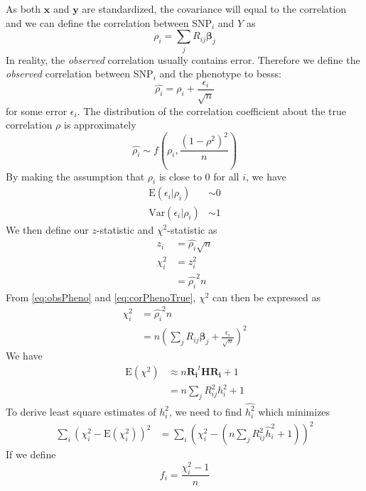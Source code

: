 			As both $\boldsymbol{x}$ and $\boldsymbol{y}$ are standardized, the covariance will equal to the correlation and we can define the correlation between \gls{SNP}$_i$ and $Y$ as
			\begin{equation}
				\rho_i = \sum_j{R_{ij}\boldsymbol{\beta}_j}
				\label{eq:corPhenoTrue}
			\end{equation}
			In reality, the \emph{observed} correlation usually contains error. 
			Therefore we define the \emph{observed} correlation between \gls{SNP}$_i$ and the phenotype to besss:
			\begin{equation}
			\hat{\rho_i} = \rho_i+\frac{\epsilon_i}{\sqrt{n}}
			\label{eq:obsPheno}
			\end{equation}
			for some error $\epsilon_i$. 
			The distribution of the correlation coefficient about the true correlation $\rho$ is approximately
			$$
				\hat{\rho_i}\sim f(\rho_i, \frac{(1-\rho^2)^2}{n})
			$$
			By making the assumption that $\rho_i$ is close to 0 for all $i$, we have 
			\begin{align*}
				\mathrm{E}(\epsilon_i|\rho_i)&\sim 0\\
				\mathrm{Var}(\epsilon_i|\rho_i)&\sim 1
			\end{align*}
			We then define our $z$-statistic and $\chi^2$-statistic as
			\begin{align*}
				z_i &= \hat{\rho_i}\sqrt{n} \\
				\chi^2_i &= z_i^2\\
				&=\hat{\rho_i}^2n
			\end{align*}
			From \cref{eq:obsPheno} and \cref{eq:corPhenoTrue}, $\chi^2$ can then be expressed as
			\begin{align*}
			\chi^2_i&=\hat{\rho_i}^2n\\
			&=n(\sum_j{R_{ij}\boldsymbol{\beta}_j}+\frac{\epsilon_i}{\sqrt{n}})^2
			\end{align*}
			We have
			\begin{align*}
			\mathrm{E}(\chi^2) &\approx n\boldsymbol{R_i}^t\boldsymbol{HR_i}+1 \nonumber\\
			&=n\sum_j{R^2_{ij}h_i^2}+1
			\end{align*}
			To derive least square estimates of $h_i^2$, we need to find $\hat{h_i^2}$ which minimizes
			\begin{align*}
				\sum_i(\chi_i^2-\mathrm{E}(\chi_i^2))^2&=\sum_i(\chi_i^2-(n\sum_j{R^2_{ij}\hat{h}_i^2}+1))^2
			\end{align*}
			If we define 
			\begin{equation}
			f_i= \frac{\chi_i^2-1}{n}
			\label{eq:defineF}
			\end{equation}
